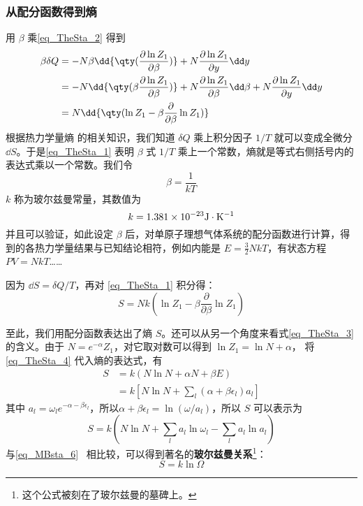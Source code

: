\subsubsection{从配分函数得到熵}
用 $\beta$ 乘\autoref{eq_TheSta_2} 得到
\begin{equation}\label{eq_TheSta_1}
\begin{aligned}
\beta \delta Q&=-N\beta\dd{\qty(\frac{\partial \ln Z_1}{\partial \beta})}+N\frac{\partial \ln Z_1}{\partial y}\dd y\\
&=-N\dd{\qty(\beta\frac{\partial \ln Z_1}{\partial \beta})}+N\frac{\partial \ln Z_1}{\partial \beta}\dd \beta+N\frac{\partial \ln Z_1}{\partial y}\dd y\\
&=N\dd{\qty(\ln Z_1-\beta\frac{\partial }{\partial \beta}\ln Z_1)}
\end{aligned}
\end{equation}
根据热力学量熵 的相关知识，我们知道 $\delta Q$ 乘上积分因子 $1/T$ 就可以变成全微分 $\dd S$。于是\autoref{eq_TheSta_1} 表明 $\beta$ 式 $1/T$ 乘上一个常数，熵就是等式右侧括号内的表达式乘以一个常数。我们令
\begin{equation}
\beta=\frac{1}{kT}
\end{equation}
$k$ 称为玻尔兹曼常量，其数值为
\begin{equation}
k=1.381\times 10^{-23} \rm{J\cdot K^{-1}}
\end{equation}
并且可以验证，如此设定 $\beta$ 后，对单原子理想气体系统的配分函数进行计算，得到的各热力学量结果与已知结论相符，例如内能是 $E=\frac{3}{2}NkT$，有状态方程 $PV=NkT$…… 

因为 $\dd S=\delta Q/T$，再对 \autoref{eq_TheSta_1} 积分得：
\begin{equation}\label{eq_TheSta_3}
S=Nk(\ln Z_1-\beta\frac{\partial }{\partial \beta}\ln Z_1)
\end{equation}

至此，我们用配分函数表达出了熵 $S$。还可以从另一个角度来看式\autoref{eq_TheSta_3} 的含义。由于 $N=e^{-\alpha}Z_1$，对它取对数可以得到 $\ln Z_1=\ln N+\alpha$，
将\autoref{eq_TheSta_4} 代入熵的表达式，有
\begin{equation}
\begin{aligned}
S&=k(N\ln N+\alpha N+\beta E)
\\&=k[N\ln N+\sum_l(\alpha+\beta\epsilon_l)a_l]
\end{aligned}
\end{equation}
其中 $a_l=\omega_le^{-\alpha-\beta\epsilon_l}$，所以$\alpha+\beta\epsilon_l=\ln(\omega/a_l)$，所以 $S$ 可以表示为
\begin{equation}
S=k(N\ln N+\sum_l a_l\ln\omega_l-\sum_l a_l\ln a_l)
\end{equation}
与\autoref{eq_MBsta_6}~ 相比较，可以得到著名的\textbf{玻尔兹曼关系}\footnote{这个公式被刻在了玻尔兹曼的墓碑上。}：
\begin{equation}\label{eq_TheSta_7}
S=k\ln \Omega
\end{equation}
